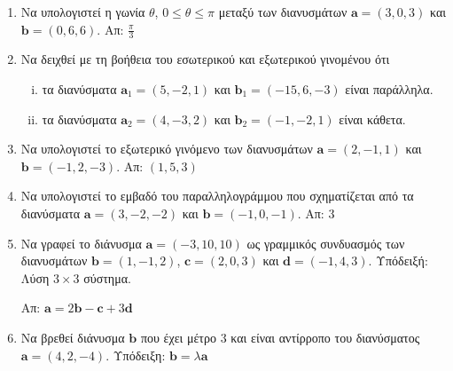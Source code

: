 


\geometry{top=2.5cm}
\pagestyle{askhseis}

\renewcommand{\vec}{\mathbf}



\begin{center}
  \minibox{\large \bfseries \textcolor{Col1}{Ασκήσεις στα Διανύσματα}}
\end{center}

\vspace{\baselineskip}

\begin{enumerate}[itemsep=0.7\baselineskip]

  \item Να υπολογιστεί η γωνία $ \theta $, $ 0\leq \theta \leq \pi $ μεταξύ των 
    διανυσμάτων $ \vec{a} = (3,0,3) $ και $ \vec{b} = (0,6,6) $.
    \hfill Απ: $ \frac{\pi}{3} $

  \item Να δειχθεί με τη βοήθεια του εσωτερικού και εξωτερικού γινομένου ότι
    \begin{enumerate}[i)]
      \item τα διανύσματα $ \vec{a}_1 = (5,-2,1) $ και $ \vec{b}_1 = (-15,6,-3) $ είναι 
        παράλληλα.
      \item τα διανύσματα $ \vec{a}_2 = (4,-3,2) $ και $ \vec{b}_2 = (-1,-2,1) $ είναι 
        κάθετα.
    \end{enumerate}

  \item Να υπολογιστεί το εξωτερικό γινόμενο των διανυσμάτων 
    $ \vec{a} = (2,-1,1) $ και $ \vec{b} = (-1,2,-3) $.
    \hfill Απ: $ (1,5,3) $

  \item Να υπολογιστεί το εμβαδό του παραλληλογράμμου που σχηματίζεται από τα 
    διανύσματα $ \vec{a} = (3,-2,-2) $ και $ \vec{b} = (-1,0,-1) $.
    \hfill Απ: $3 $ 

  \item Να γραφεί το διάνυσμα $ \vec{a}=(-3,10,10) $ ως γραμμικός συνδυασμός των 
    διανυσμάτων $\vec{b}=(1,-1,2)$, $ \vec{c}=(2,0,3) $ και $ \vec{d}=(-1,4,3) $.  
    \hfill Υπόδειξή: Λύση $ 3\times 3 $ σύστημα. 

    \hfill Απ: $ \vec{a}=2\vec{b}-\vec{c}+3\vec{d} $

  \item Να βρεθεί διάνυσμα $ \vec{b} $ που έχει μέτρο $3$ και είναι αντίρροπο του 
    διανύσματος $ \vec{a}=(4,2,-4)$.
    \hfill Υπόδειξη: $ \vec{b} = \lambda \vec{a} $		


\end{enumerate}

